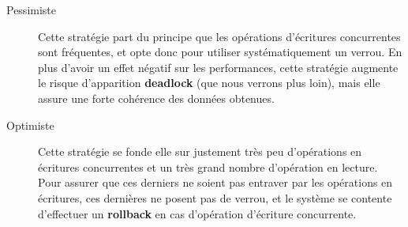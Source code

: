 {  \begin{description}
    \item[Pessimiste] Cette stratégie part du principe que les opérations d'écritures concurrentes
    sont fréquentes, et opte donc pour utiliser systématiquement un verrou. En plus d'avoir un effet
    négatif sur les performances, cette stratégie augmente le risque d'apparition \textbf{deadlock} (que
    nous verrons plus loin), mais elle assure une forte cohérence des données obtenues.
    \item[Optimiste] Cette stratégie se fonde elle sur justement très peu d'opérations en écritures
    concurrentes et un très grand nombre d'opération en lecture. Pour assurer que ces derniers ne
    soient pas entraver par les opérations en écritures, ces dernières ne posent pas de verrou, et
    le système se contente d'effectuer un \textbf{rollback} en cas d'opération d'écriture
    concurrente.
  \end{description}
}


